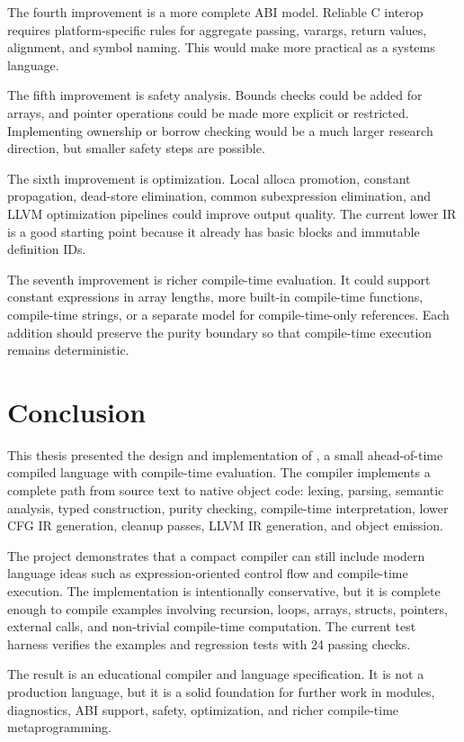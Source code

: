 The fourth improvement is a more complete ABI model. Reliable C interop requires
platform-specific rules for aggregate passing, varargs, return values, alignment,
and symbol naming. This would make \epl{} more practical as a systems language.

The fifth improvement is safety analysis. Bounds checks could be added for
arrays, and pointer operations could be made more explicit or restricted.
Implementing ownership or borrow checking would be a much larger research
direction, but smaller safety steps are possible.

The sixth improvement is optimization. Local alloca promotion, constant
propagation, dead-store elimination, common subexpression elimination, and LLVM
optimization pipelines could improve output quality. The current lower IR is a
good starting point because it already has basic blocks and immutable
definition IDs.

The seventh improvement is richer compile-time evaluation. It could support
constant expressions in array lengths, more built-in compile-time functions,
compile-time strings, or a separate model for compile-time-only references.
Each addition should preserve the purity boundary so that compile-time execution
remains deterministic.

\section{Conclusion}

This thesis presented the design and implementation of \epl{}, a small
ahead-of-time compiled language with compile-time evaluation. The compiler
implements a complete path from source text to native object code: lexing,
parsing, semantic analysis, typed \irtree{} construction, purity checking,
compile-time interpretation, lower CFG IR generation, cleanup passes, LLVM IR
generation, and object emission.

The project demonstrates that a compact compiler can still include modern
language ideas such as expression-oriented control flow and compile-time
execution. The implementation is intentionally conservative, but it is complete
enough to compile examples involving recursion, loops, arrays, structs,
pointers, external calls, and non-trivial compile-time computation. The current
test harness verifies the examples and regression tests with 24 passing checks.

The result is an educational compiler and language specification. It is not a
production language, but it is a solid foundation for further work in modules,
diagnostics, ABI support, safety, optimization, and richer compile-time
metaprogramming.

